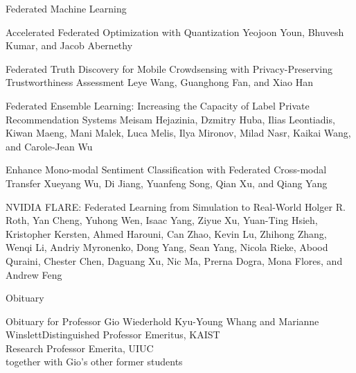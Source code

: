 \documentclass[11pt]{article}
\begin{document}
\begin{bulletin}
\begin{articlesection}{Federated Machine Learning}
\begin{article}
{Accelerated Federated Optimization with Quantization}
{Yeojoon Youn, Bhuvesh Kumar, and Jacob Abernethy}

\end{article}



\begin{article}
{Federated Truth Discovery for Mobile Crowdsensing with Privacy-Preserving Trustworthiness Assessment}
{Leye Wang, Guanghong Fan, and Xiao Han}

\end{article}

\begin{article}
{Federated Ensemble Learning: Increasing the Capacity of Label Private Recommendation Systems}
{Meisam Hejazinia, Dzmitry Huba, Ilias Leontiadis, Kiwan Maeng, Mani Malek, Luca Melis, Ilya Mironov, Milad Nasr, Kaikai Wang, and Carole-Jean Wu}

\end{article}

\begin{article}
{Enhance Mono-modal Sentiment Classification with Federated Cross-modal Transfer}
{Xueyang Wu, Di Jiang, Yuanfeng Song, Qian Xu, and Qiang Yang}

\end{article}



\begin{article}
{NVIDIA FLARE: Federated Learning from Simulation to Real-World}
{Holger R. Roth,
Yan Cheng,
Yuhong Wen,
Isaac Yang,
Ziyue Xu,
Yuan-Ting Hsieh,
Kristopher Kersten,
Ahmed Harouni,
Can Zhao,
Kevin Lu,
Zhihong Zhang,
Wenqi Li,
Andriy Myronenko,
Dong Yang,
Sean Yang,
Nicola Rieke,
Abood Quraini,
Chester Chen,
Daguang Xu,
Nic Ma,
Prerna Dogra,
Mona Flores, and
Andrew Feng}

\end{article}
\newpage

\end{articlesection}



\begin{newssection}{Obituary}
\begin{news}{Obituary for Professor Gio Wiederhold}
{Kyu-Young Whang and Marianne Winslett}{Distinguished Professor Emeritus, KAIST\\ Research Professor Emerita, UIUC\\ together with Gio’s other former students}

\end{news}


\end{newssection}
\end{bulletin}
\end{document}
